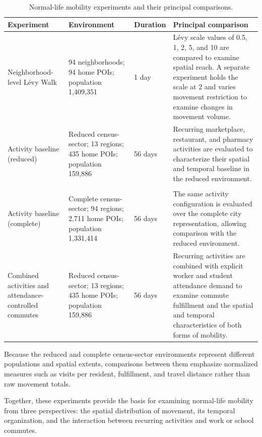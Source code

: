 \begin{table}[ht]
\centering
\footnotesize
\setlength{\tabcolsep}{4pt}
\caption{Normal-life mobility experiments and their principal comparisons.}
\label{tbl:routine_mobility_scenarios}
\begin{tabularx}{\linewidth}{@{}p{3.1cm}p{3.1cm}p{1.8cm}X@{}}
\toprule
\textbf{Experiment} &
\textbf{Environment} &
\textbf{Duration} &
\textbf{Principal comparison} \\
\midrule

Neighborhood-level Lévy Walk
& 94 neighborhoods; 94 home POIs; population 1,409,351
& 1 day
& Lévy scale values of 0.5, 1, 2, 5, and 10 are compared to examine spatial reach. A separate experiment holds the scale at 2 and varies movement restriction to examine changes in movement volume. \\

Activity baseline (reduced)
& Reduced census-sector; 13 regions; 435 home POIs; population 159,886
& 56 days
& Recurring marketplace, restaurant, and pharmacy activities are evaluated to characterize their spatial and temporal baseline in the reduced environment. \\ \\

Activity baseline (complete)
& Complete census-sector; 94 regions; 2,711 home POIs; population 1,331,414
& 56 days
& The same activity configuration is evaluated over the complete city representation, allowing comparison with the reduced environment. \\

Combined activities and attendance-controlled commutes
& Reduced census-sector; 13 regions; 435 home POIs; population 159,886
& 56 days
& Recurring activities are combined with explicit worker and student attendance demand to examine commute fulfillment and the spatial and temporal characteristics of both forms of mobility. \\

\bottomrule
\end{tabularx}
\end{table}

Because the reduced and complete census-sector environments represent different populations and spatial extents, comparisons between them emphasize normalized measures such as visits per resident, fulfillment, and travel distance rather than raw movement totals.

Together, these experiments provide the basis for examining normal-life mobility from three perspectives: the spatial distribution of movement, its temporal organization, and the interaction between recurring activities and work or school commutes.

